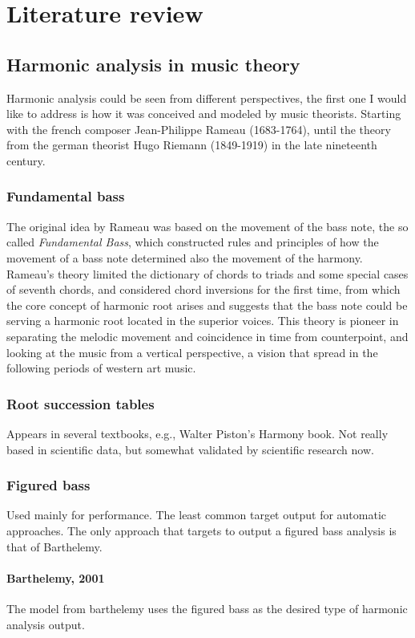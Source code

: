 \chapter{Literature review}
\section{Harmonic analysis in music theory}
Harmonic analysis could be seen from different perspectives, the first one I would like to address is how it was conceived and modeled by music theorists. Starting with the french composer Jean-Philippe Rameau (1683-1764), until the theory from the german theorist Hugo Riemann (1849-1919) in the late nineteenth century.
  \subsection{Fundamental bass}
  The original idea by Rameau was based on the movement of the bass note, the so called \emph{Fundamental Bass}, which constructed rules and principles of how the movement of a bass note determined also the movement of the harmony. Rameau's theory limited the dictionary of chords to triads and some special cases of seventh chords, and considered chord inversions for the first time, from which the core concept of harmonic root arises and suggests that the bass note could be serving a harmonic root located in the superior voices. This theory is pioneer in separating the melodic movement and coincidence in time from counterpoint, and looking at the music from a vertical perspective, a vision that spread in the following periods of western art music.
  \subsection{Root succession tables}
  Appears in several textbooks, e.g., Walter Piston's Harmony book. Not really based in scientific data, but somewhat validated by scientific research now.
  \subsection{Figured bass}
  Used mainly for performance. The least common target output for automatic approaches. The only approach that targets to output a figured bass analysis is that of Barthelemy.
    \subsubsection{Barthelemy, 2001}
    The model from barthelemy uses the figured bass as the desired type of harmonic analysis output.

